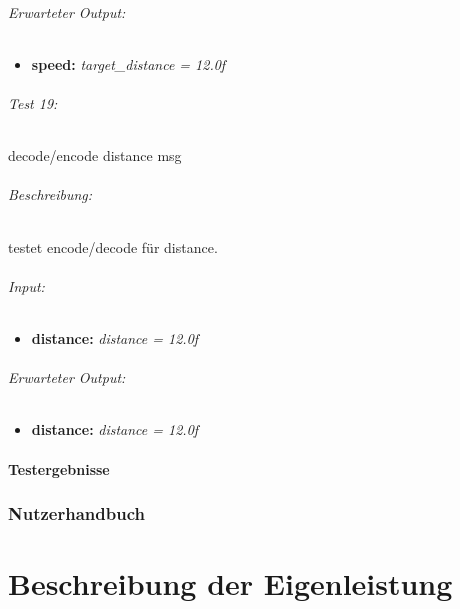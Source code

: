 \documentclass[a4paper, 12pt, titlepage]{scrartcl}
\begin{document}
{			\paragraph{Erwarteter Output:}
			\begin{itemize} \itemsep-0.5em
				\item \textbf{speed:} \emph{target\_distance = 12.0f}
			\end{itemize}
			
			\paragraph{Test 19:}{decode/encode distance msg}
			\paragraph{Beschreibung:} testet encode/decode für distance.
			\paragraph{Input:}
			\begin{itemize} \itemsep-0.5em
				\item \textbf{distance:} \emph{distance = 12.0f}
			\end{itemize}
			\paragraph{Erwarteter Output:}
			\begin{itemize} \itemsep-0.5em
				\item \textbf{distance:} \emph{distance = 12.0f}
			\end{itemize}
									
		\subsection{Testergebnisse}
		\label{test_ergebnisse}
	\section{Nutzerhandbuch} 
	\label{nutzerhandbuch}
\newpage
\part{Beschreibung der Eigenleistung}
\label{eigenleistung}
}
\end{document}
